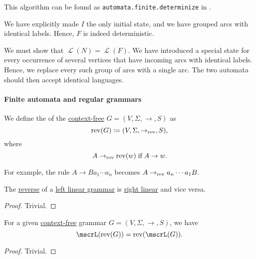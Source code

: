 \begin{comments}
  \item This algorithm can be found as \texttt{automata.finite.determinize} in \cite{notebook:code}.
\end{comments}
\begin{defproof}
  We have explicitly made \( I \) the only initial state, and we have grouped arcs with identical labels. Hence, \( F \) is indeed deterministic.

  We must show that \( \mscrL(N) = \mscrL(F) \). We have introduced a special state for every occurrence of several vertices that have incoming arcs with identical labels. Hence, we replace every such group of arcs with a single arc. The two automata should then accept identical languages.
\end{defproof}

\paragraph{Finite automata and regular grammars}

\begin{definition}\label{def:reverse_grammar}
  We define the  of the \hyperref[def:chomsky_hierarchy/context_free]{context-free} \( G = (V, \Sigma, \to, S) \) as
  \begin{equation*}
    \op{rev}(G) \coloneqq (V, \Sigma, \to_{\op{rev}}, S),
  \end{equation*}
  where
  \begin{equation*}
    A \to_{\op{rev}} \op{rev}(w) \T{if} A \to w.
  \end{equation*}
\end{definition}
\begin{comments}
  \item For example, the rule \( A \to Ba_1 \cdots a_n \) becomes \( A \to_{\op{rev}} a_n \cdots a_1 B \).
\end{comments}

\begin{proposition}\label{thm:reverse_linear_grammar}
  The \hyperref[def:reverse_grammar]{reverse} of a \hyperref[def:chomsky_hierarchy/regular]{left linear grammar} is \hyperref[def:chomsky_hierarchy/regular]{right linear} and vice versa.
\end{proposition}
\begin{proof}
  Trivial.
\end{proof}

\begin{proposition}\label{thm:reverse_grammar_language}
  For a given \hyperref[def:chomsky_hierarchy/context_free]{context-free} grammar \( G = (V, \Sigma, \to, S) \), we have
  \begin{equation*}
    \mscrL(\op{rev}(G)) = \op{rev}(\mscrL(G)).
  \end{equation*}
\end{proposition}
\begin{proof}
  Trivial.
\end{proof}

